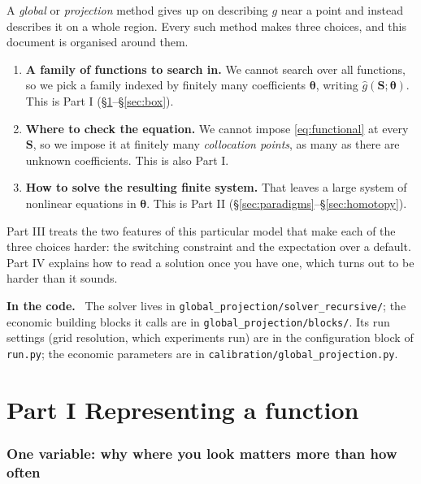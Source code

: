\documentclass[10pt,a4paper]{article}
\newenvironment{incode}{\begin{leftbar}\small\noindent\textcolor{codecol}{\textbf{In the code.}}\ }{\end{leftbar}}
\theoremstyle{plain}
\theoremstyle{remark}
\newcommand{\st}{\mathbf{S}}
\newcommand{\pol}{\bm{\theta}}
\newcommand{\file}[1]{\textcolor{codecol}{\texttt{#1}}}
\begin{document}
A \emph{global} or \emph{projection} method gives up on describing $g$ near a point and
instead describes it on a whole region. Every such method makes three choices, and this
document is organised around them.

\begin{enumerate}
\item \textbf{A family of functions to search in.} We cannot search over all functions, so we
pick a family indexed by finitely many coefficients $\pol$, writing $\hat g(\st;\pol)$.
This is Part I (\S\ref{sec:1d}--\S\ref{sec:box}).
\item \textbf{Where to check the equation.} We cannot impose \eqref{eq:functional} at every
$\st$, so we impose it at finitely many \emph{collocation points}, as many as there are
unknown coefficients. This is also Part I.
\item \textbf{How to solve the resulting finite system.} That leaves a large system of
nonlinear equations in $\pol$. This is Part II (\S\ref{sec:paradigms}--\S\ref{sec:homotopy}).
\end{enumerate}

\noindent Part III treats the two features of this particular model that make each of the
three choices harder: the switching constraint and the expectation over a default. Part IV
explains how to read a solution once you have one, which turns out to be harder than it
sounds.

\begin{incode}
The solver lives in \file{global\_projection/solver\_recursive/}; the economic building blocks
it calls are in \file{global\_projection/blocks/}. Its run settings (grid resolution, which
experiments run) are in the configuration block of \file{run.py}; the economic parameters are
in \file{calibration/global\_projection.py}.
\end{incode}

\part*{Part I \quad Representing a function}
\section{One variable: why where you look matters more than how often}
\label{sec:1d}
\end{document}
